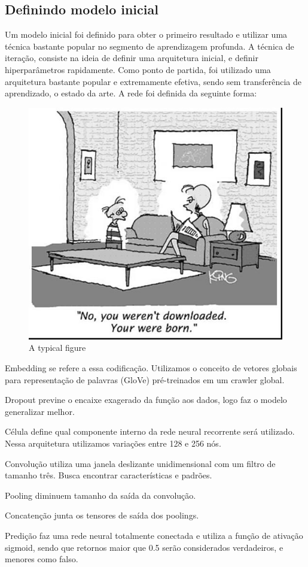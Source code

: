 \documentclass[12pt]{article}
\begin{document}
\subsection{Definindo modelo inicial}

Um modelo inicial foi definido para obter o primeiro resultado e utilizar uma técnica bastante popular no segmento de aprendizagem profunda. A técnica de iteração, consiste na ideia de definir uma arquitetura inicial, e definir hiperparâmetros rapidamente. Como ponto de partida, foi utilizado uma arquitetura bastante popular e extremamente efetiva, sendo sem transferência de aprendizado, o estado da arte. A rede foi definida da seguinte forma:

\begin{figure}[ht]
\centering
\includegraphics[width=.5\textwidth]{images/fig1.jpg}
\caption{A typical figure}
\label{fig:exampleFig1}
\end{figure}

Embedding se refere a essa codificação. Utilizamos o conceito de vetores globais para representação de palavras (GloVe) pré-treinados em um crawler global.

Dropout previne o encaixe exagerado da função aos dados, logo faz o modelo generalizar melhor.

Célula define qual componente interno da rede neural recorrente será utilizado. Nessa arquitetura utilizamos variações entre 128 e 256 nós.

Convolução utiliza uma janela deslizante unidimensional com um filtro de tamanho três. Busca encontrar características e padrões.

Pooling diminuem tamanho da saída da convolução.

Concatenção junta os tensores de saída dos poolings.

Predição faz uma rede neural totalmente conectada e utiliza a função de ativação sigmoid, sendo que retornos maior que 0.5 serão considerados verdadeiros, e menores como falso.
\end{document}
